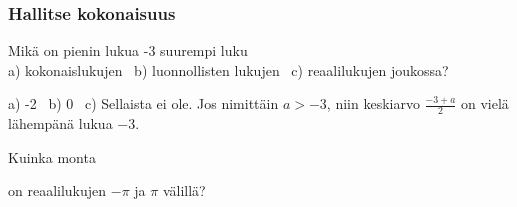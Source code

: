 \begin{tehtavasivu}
\begin{tehtava}%
\begin{alakohdat}
\end{alakohdat}
\begin{vastaus}
\begin{alakohdat}
\end{alakohdat}
\end{vastaus}
\end{tehtava}



\subsubsection*{Hallitse kokonaisuus}

\begin{tehtava}
Mikä on pienin lukua -3 suurempi luku \\
a) kokonaislukujen \ b) luonnollisten lukujen \ c) reaalilukujen joukossa?
\begin{vastaus}
a) -2 \ b) 0 \ c) Sellaista ei ole. Jos nimittäin $a > -3$, niin keskiarvo
$\frac{-3+a}{2}$ on vielä lähempänä lukua $-3$. 
\end{vastaus}
\end{tehtava}

\begin{tehtava}
Kuinka monta 
\begin{alakohdat}
\end{alakohdat}
on reaalilukujen \(-\pi\) ja \(\pi\) välillä?
\begin{vastaus}
\begin{alakohdat}
\end{alakohdat}
\end{vastaus}
\end{tehtava}


\end{tehtavasivu}
